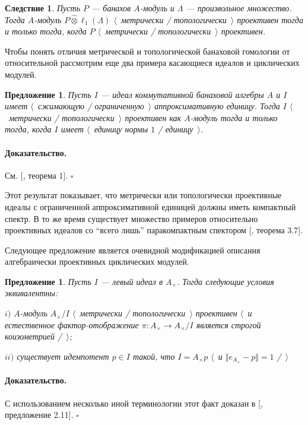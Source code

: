 \documentclass[12pt]{article}
\newcommand{\projtens}{\mathbin{\widehat{\otimes}}}
\newtheorem{proposition}[theorem]{Предложение}
\newtheorem{corollary}[theorem]{Следствие}
\renewenvironment{proof}{\paragraph{Доказательство.}}{\hfill$\square$\medskip}
\begin{document}
\begin{corollary}\label{MetTopProjTensProdWithl1} Пусть $P$ --- банахов $A$-модуль и $\Lambda$ --- произвольное множество. Тогда $A$-модуль $P\projtens \ell_1(\Lambda)$ $\langle$~метрически / топологически~$\rangle$ проективен тогда и только тогда, когда $P$ $\langle$~метрически / топологически~$\rangle$ проективен.
\end{corollary}

Чтобы понять отличия метрической и топологической банаховой гомологии от относительной рассмотрим еще два примера касающиеся идеалов и циклических модулей. 

\begin{proposition}\label{GoodCommIdealMetTopProjIsUnital} Пусть $I$ --- идеал коммутативной банаховой алгебры $A$ и $I$ имеет $\langle$~сжимающую / ограниченную~$\rangle$ аппроксимативную единицу. Тогда $I$ $\langle$~метрически / топологически~$\rangle$ проективен как $A$-модуль тогда и только тогда, когда $I$ имеет $\langle$~единицу нормы $1$ / единицу~$\rangle$.
\end{proposition}
\begin{proof} См. [\cite{NemMetTopProjIdBanAlg}, теорема 1].
\end{proof}

Этот результат показывает, что метрически или топологически проективные идеалы с ограниченной аппроксимативной единицей должны иметь компактный спектр. В то же время существует множество примеров относительно проективных идеалов со ``всего лишь'' паракомпактным спектором [\cite{HelHomolBanTopAlg}, теорема 3.7].

Следующее предложение является очевидной модификацией описания алгебраически проективных циклических модулей. 

\begin{proposition}\label{MetTopProjCycModCharac} Пусть $I$ --- левый идеал в $A_\times $. Тогда следующие условия эквивалентны:

$i)$ $A$-модуль $A_\times /I$ $\langle$~метрически / топологически~$\rangle$ проективен $\langle$~и естественное фактор-отображение $\pi:A_\times \to A_\times /I$ является строгой коизометрией /~$\rangle$;

$ii)$ существует идемпотент $p\in I$ такой, что $I=A_\times  p$ $\langle$~и $\Vert e_{A_\times }-p\Vert= 1$ /~$\rangle$
\end{proposition}
\begin{proof} С использованием несколько иной терминологии этот факт доказан в [\cite{WhiteInjmoduAlg}, предложение 2.11].
\end{proof}
\end{document}
